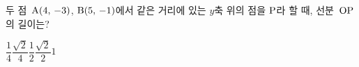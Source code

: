 두 점~$\mathrm{A}(4,\,-3)$, $\mathrm{B}(5,\,-1)$에서 같은 거리에 있는 $y$축 위의 점을 $\mathrm{P}$라 할 때, 선분~$\mathrm{OP}$의 길이는? 
\begin{choices32}{$\dfrac{1}{4}$}{$\dfrac{\sqrt{2}}{4}$}{$\dfrac{1}{2}$}{$\dfrac{\sqrt{2}}{2}$}{$1$}\end{choices32}
